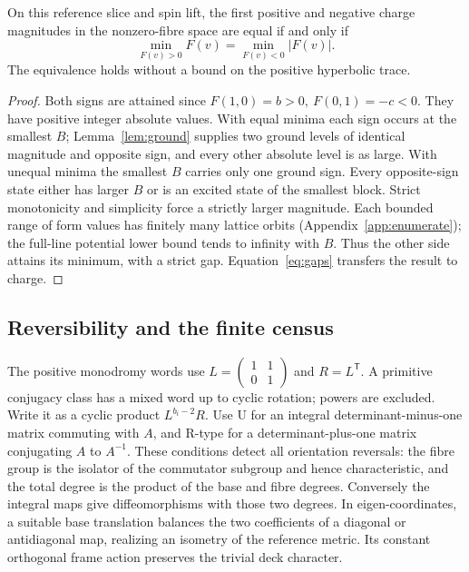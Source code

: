 \begin{theorem}\label{thm:sol}
On this reference slice and spin lift, the first positive and negative charge magnitudes in the nonzero-fibre space are equal if and only if
\[
 \min_{F(v)>0}F(v)=\min_{F(v)<0}|F(v)|.
\]
The equivalence holds without a bound on the positive hyperbolic trace.
\end{theorem}
\begin{proof}
Both signs are attained since \(F(1,0)=b>0,\ F(0,1)=-c<0\). They have positive integer absolute values. With equal minima each sign occurs at the smallest \(B\); Lemma~\ref{lem:ground} supplies two ground levels of identical magnitude and opposite sign, and every other absolute level is as large. With unequal minima the smallest \(B\) carries only one ground sign. Every opposite-sign state either has larger \(B\) or is an excited state of the smallest block. Strict monotonicity and simplicity force a strictly larger magnitude. Each bounded range of form values has finitely many lattice orbits (Appendix~\ref{app:enumerate}); the full-line potential lower bound tends to infinity with \(B\). Thus the other side attains its minimum, with a strict gap. Equation~\eqref{eq:gaps} transfers the result to charge.
\end{proof}

\subsection{Reversibility and the finite census}
The positive monodromy words use \(L=\left(\begin{smallmatrix}1&1\\0&1\end{smallmatrix}\right)\) and \(R=L^\mathsf T\). A primitive conjugacy class has a mixed word up to cyclic rotation; powers are excluded. Write it as a cyclic product \(L^{b_i-2}R\). Use U for an integral determinant-minus-one matrix commuting with \(A\), and R-type for a determinant-plus-one matrix conjugating \(A\) to \(A^{-1}\). These conditions detect all orientation reversals: the fibre group is the isolator of the commutator subgroup and hence characteristic, and the total degree is the product of the base and fibre degrees. Conversely the integral maps give diffeomorphisms with those two degrees. In eigen-coordinates, a suitable base translation balances the two coefficients of a diagonal or antidiagonal map, realizing an isometry of the reference metric. Its constant orthogonal frame action preserves the trivial deck character.

